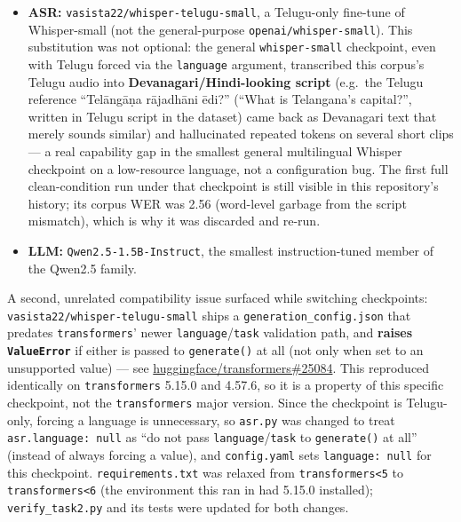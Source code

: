 \documentclass[11pt]{article}
\begin{document}
\begin{itemize}[leftmargin=1.4em]
\item \textbf{ASR:} \texttt{vasista22/whisper-telugu-small}, a Telugu-only fine-tune of Whisper-small (not the general-purpose \texttt{openai/whisper-small}). This substitution was not optional: the general \texttt{whisper-small} checkpoint, even with Telugu forced via the \texttt{language} argument, transcribed this corpus's Telugu audio into \textbf{Devanagari/Hindi-looking script} (e.g.\ the Telugu reference ``Tel\={a}ng\={a}\d{n}a r\={a}jadh\={a}ni \={e}di?'' (``What is Telangana's capital?'', written in Telugu script in the dataset) came back as Devanagari text that merely sounds similar) and hallucinated repeated tokens on several short clips --- a real capability gap in the smallest general multilingual Whisper checkpoint on a low-resource language, not a configuration bug. The first full clean-condition run under that checkpoint is still visible in this repository's history; its corpus WER was 2.56 (word-level garbage from the script mismatch), which is why it was discarded and re-run.
\item \textbf{LLM:} \texttt{Qwen2.5-1.5B-Instruct}, the smallest instruction-tuned member of the Qwen2.5 family.
\end{itemize}

A second, unrelated compatibility issue surfaced while switching checkpoints: \texttt{vasista22/whisper-telugu-small} ships a \texttt{generation\_config.json} that predates \texttt{transformers}' newer \texttt{language}/\texttt{task} validation path, and \textbf{raises \texttt{ValueError}} if either is passed to \texttt{generate()} at all (not only when set to an unsupported value) --- see \href{https://github.com/huggingface/transformers/issues/25084}{huggingface/transformers\#25084}. This reproduced identically on \texttt{transformers} 5.15.0 and 4.57.6, so it is a property of this specific checkpoint, not the \texttt{transformers} major version. Since the checkpoint is Telugu-only, forcing a language is unnecessary, so \texttt{asr.py} was changed to treat \texttt{asr.language: null} as ``do not pass \texttt{language}/\texttt{task} to \texttt{generate()} at all'' (instead of always forcing a value), and \texttt{config.yaml} sets \texttt{language: null} for this checkpoint. \texttt{requirements.txt} was relaxed from \texttt{transformers<5} to \texttt{transformers<6} (the environment this ran in had 5.15.0 installed); \texttt{verify\_task2.py} and its tests were updated for both changes.
\end{document}
